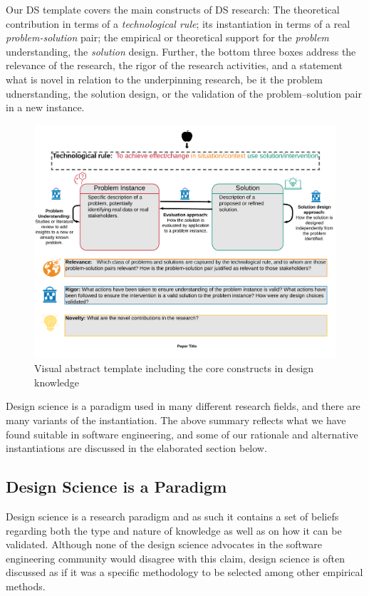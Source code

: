 \documentclass[graybox]{svmult}
\begin{document}
Our DS template covers the main constructs of DS research: The theoretical contribution in terms of a \emph{technological rule}; its instantiation in terms of a real \emph{problem-solution} pair;  the empirical or theoretical support for the \emph{problem} understanding, the \emph{solution} design. Further, the bottom three boxes address the relevance of the research, the rigor of the research activities, and a statement what is novel in relation to the underpinning research, be it the problem udnerstanding, the solution design, or the validation of the problem--solution pair in a new instance.
\begin{figure}
  \includegraphics[width=1.0\textwidth]{Figures/GenericVA.png}
\caption{Visual abstract template including the core constructs in design knowledge}
\label{fig:VA-template}       %
\end{figure}

Design science is a paradigm used in many different research fields, and there are many variants of the instantiation. The above summary reflects what we have found suitable in software engineering, and some of our rationale and alternative instantiations are discussed in the elaborated section below.


\subsection{Design Science is a Paradigm}
Design science is a research paradigm and as such it contains a set of beliefs regarding both the type and nature of knowledge as well as on how it can be validated. Although none of the design science advocates in the software engineering community would disagree with this claim, design science is often discussed as if it was a specific methodology to be selected among other empirical methods. 
\end{document}
